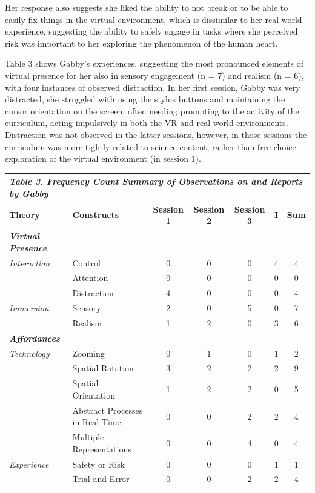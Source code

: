 \documentclass[11.5pt]{sig-alternate} %
\begin{document}
\begin{large}
Her response also suggests she liked the ability to not break or to be able to easily fix things in the virtual environment, which is dissimilar to her real-world experience, suggesting the ability to safely engage in tasks where she perceived risk was important to her exploring the phenomenon of the human heart. 

Table 3 shows Gabby’s experiences, suggesting the most pronounced elements of virtual presence for her also in sensory engagement (n = 7) and realism (n = 6), with four instances of observed distraction.  In her first session, Gabby was very distracted, she struggled with using the stylus buttons and maintaining the cursor orientation on the screen, often needing prompting to the activity of the curriculum, acting impulsively in both the VR and real-world environments. Distraction was not observed in the latter sessions, however, in those sessions the curriculum was more tightly related to science content, rather than free-choice exploration of the virtual environment (in session 1). 

\begin{table}
\begin{tabular}[h]{llccccc}
\hline
\multicolumn{7}{l}{\textit{\textbf{Table 3.} Frequency Count Summary of Observations on and Reports by Gabby}} \\
\hline
\textbf{Theory} & \textbf{Constructs} & \textbf{Session 1} & \textbf{Session 2} & \textbf{Session 3} & \textbf{I} & \textbf{Sum} \\
\hline
\textit{\textbf{Virtual Presence}} & & & & & & \\
\textit{Interaction} & Control & 0 & 0 & 0 & 4 & 4 \\
 & Attention & 0 & 0 & 0 & 0 & 0 \\
 & Distraction & 4 & 0 & 0 & 0 & 4 \\
\textit{Immersion} & Sensory & 2 & 0 & 5 & 0 & 7 \\
 & Realism & 1 & 2 & 0 & 3 & 6 \\
\hline
\textit{\textbf{Affordances}} & & & & & & \\
\textit{Technology} & Zooming & 0 & 1 & 0 & 1 & 2 \\
 & Spatial Rotation & 3 & 2 & 2 & 2 & 9 \\
 & Spatial Orientation & 1 & 2 & 2 & 0 & 5 \\
 & Abstract Processes in Real Time & 0 & 0 & 2 & 2 & 4 \\
 & Multiple Representations & 0 & 0 & 4 & 0 & 4 \\
\textit{Experience} & Safety or Risk & 0 & 0 & 0 & 1 & 1 \\
 & Trial and Error & 0 & 0 & 2 & 2 & 4 \\
\hline
\end{tabular}
\end{table}


\end{large}
\end{document}

